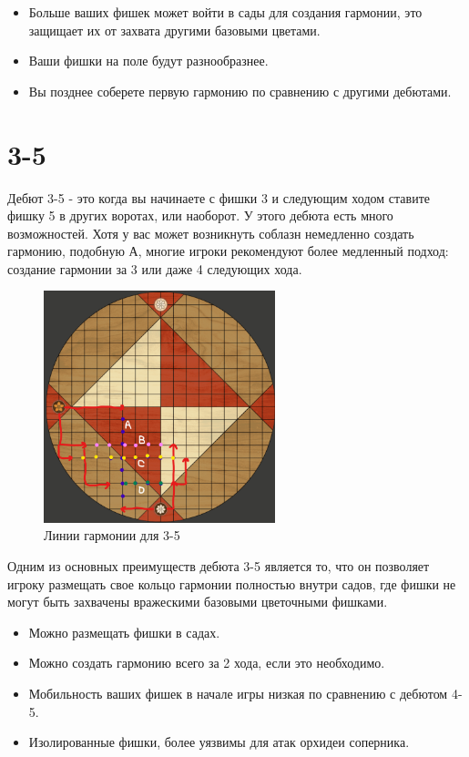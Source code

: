 \documentclass[a4paper,12pt]{diplom}
\begin{document}
\begin{itemize}
	\item Больше ваших фишек может войти в сады для создания гармонии, это защищает их от захвата другими базовыми цветами.
	\item Ваши фишки на поле будут разнообразнее.
	\item Вы позднее соберете первую гармонию по сравнению с другими дебютами.
\end{itemize}

\section{3-5}

Дебют 3-5 - это когда вы начинаете с фишки 3 и следующим ходом ставите фишку 5 в других воротах, или наоборот. У этого дебюта есть много возможностей. Хотя у вас может возникнуть соблазн немедленно создать гармонию, подобную А, многие игроки рекомендуют более медленный подход: создание гармонии за 3 или даже 4 следующих хода.

\begin{figure}[!ht]
	\centering
	\includegraphics[width=0.6\textwidth]{pictures/3-5.png}
	\caption{Линии гармонии для 3-5}
	\label{fig:2}
\end{figure}

Одним из основных преимуществ дебюта 3-5 является то, что он позволяет игроку размещать свое кольцо гармонии полностью внутри садов, где фишки не могут быть захвачены вражескими базовыми цветочными фишками.

\begin{itemize}
	\item Можно размещать фишки в садах.
	\item Можно создать гармонию всего за 2 хода, если это необходимо.
	\item Мобильность ваших фишек в начале игры низкая по сравнению с дебютом 4-5.
	\item Изолированные фишки, более уязвимы для атак орхидеи соперника.
\end{itemize}
\end{document}
